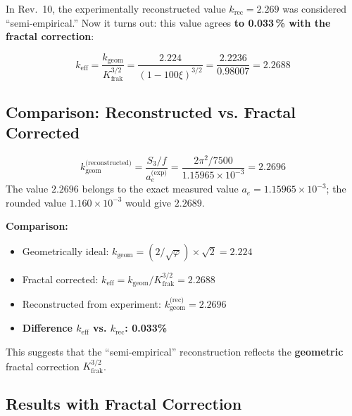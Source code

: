 	In Rev.~10, the experimentally reconstructed value $k_\text{rec} = 2.269$ was considered ``semi-empirical.'' Now it turns out: this value agrees \textbf{to 0.033\,\% with the fractal correction}:
	
	\begin{equation}
		\boxed{k_\text{eff} = \frac{k_\text{geom}}{K_\text{frak}^{3/2}} = \frac{2.224}{(1-100\xi)^{3/2}} = \frac{2.2236}{0.98007} = 2.2688}
	\end{equation}
	
	\subsection{Comparison: Reconstructed vs. Fractal Corrected}
	
	\begin{equation}
		k_{\text{geom}}^{\text{(reconstructed)}} = \frac{S_3/f}{a_e^{\text{(exp)}}} = \frac{2\pi^2 / 7500}{1.15965 \times 10^{-3}} = 2.2696
	\end{equation}
	The value $2.2696$ belongs to the exact measured value $a_e = 1.15965 \times 10^{-3}$; the rounded value $1.160 \times 10^{-3}$ would give $2.2689$.

	
	\textbf{Comparison:}
	\begin{itemize}
		\item Geometrically ideal: $k_{\text{geom}} = (2/\sqrt{\varphi}) \times \sqrt{2} = 2.224$
		\item Fractal corrected: $k_{\text{eff}} = k_{\text{geom}} / K_\text{frak}^{3/2} = 2.2688$
		\item Reconstructed from experiment: $k_{\text{geom}}^{\text{(rec)}} = 2.2696$
		\item \textbf{Difference $k_\text{eff}$ vs. $k_\text{rec}$: 0.033\%}
	\end{itemize}
	
	This suggests that the ``semi-empirical'' reconstruction reflects the \textbf{geometric} fractal correction $K_\text{frak}^{3/2}$.
	
	\subsection{Results with Fractal Correction}
	
	\begin{table}[h]
		\centering
		\caption{Absolute values with geometric vs. fractal corrected $k_\text{eff}$}
	\end{table}
	
